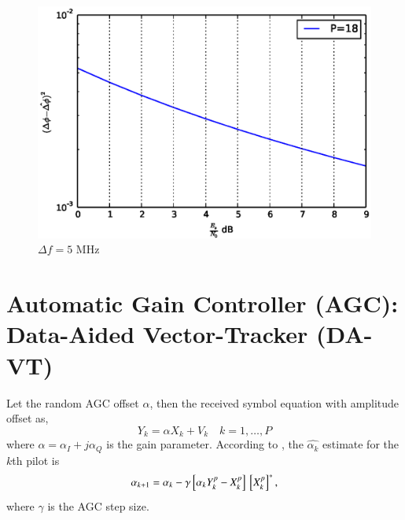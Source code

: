 \documentclass[journal,12pt,twocolumn]{IEEEtran}
\begin{document}
\begin{figure}[!hb]
\begin{center}
\includegraphics[width=\columnwidth]{./figs/Phase_error_with_respect_to_SNR_fixed_pilot.eps}
\end{center}
\caption{$\Delta f = 5$ MHz}
\label{fig:phaseerrorsnr}
\end{figure}
%
\section{Automatic Gain Controller (AGC): Data-Aided Vector-Tracker (DA-VT) }
Let the random AGC offset $\alpha$, then the received symbol equation with amplitude offset as,
\begin{equation}
\label{eq:AGC model}
Y_k = \alpha X_k +V_k  \quad k = 1,\dots,P
\end{equation}
%
where $\alpha = \alpha_I+j\alpha_Q$ is the gain parameter.
According to \cite{agc}, the $\hat{\alpha_k}$ estimate for the $k$th pilot is
%
\begin{equation}
\alpha_{k+1}=
\alpha_k-\gamma{}\left[\alpha_k Y^p_k - X^p_k\right]{}\left[X^p_k\right]^*, 
\end{equation}
%
where $\gamma$ is the AGC step size.
%
\end{document}
